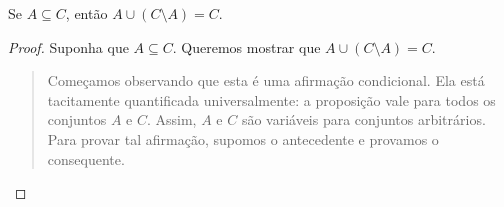 \documentclass[../../../include/open-logic-section]{subfiles}
\begin{document}


\begin{prop}
Se $A \subseteq C$, então $A \cup (C \setminus A) = C$.
\end{prop}  

\begin{proof}
  Suponha que $A \subseteq C$.  Queremos mostrar que $A \cup (C
  \setminus A) = C$.
  \begin{quote}
    Começamos observando que esta é uma afirmação condicional. Ela está
    tacitamente quantificada universalmente: a proposição vale para todos os conjuntos
    $A$ e $C$. Assim, $A$ e $C$ são variáveis para conjuntos arbitrários. Para
    provar tal afirmação, supomos o antecedente e provamos o
    consequente.


\end{quote}
\end{proof}
\end{document}
